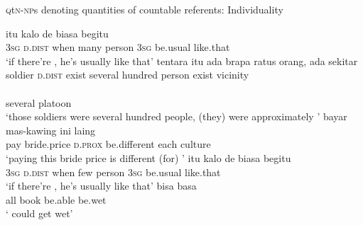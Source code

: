 \begin{styleExampleTitle}
\textsc{q}t\textsc{n-np}s denoting  quantities of countable referents: Individuality
\end{styleExampleTitle}
\ea
\label{Example_8.78}
 {itu} {kalo} {} {} {de} {biasa} {begitu}\\ %
 \textsc{3sg}  \textsc{d.dist}  when  many  person  \textsc{3sg}  be.usual  like.that\\
\glt 
‘if there’re , he’s usually like that’ \textstyleExampleSource{[081025-006-Cv.0272]}
\z
\ea
\label{Example_8.79}
\gll tentara  {itu}  ada  brapa  ratus  orang,  ada  sekitar\\
 soldier  {\textsc{d.dist}}  exist  several  hundred  person  exist  vicinity\\
   {}\\
 {several}  {platoon}\\
\glt 
‘those soldiers were several hundred people, (they) were approximately ’ \textstyleExampleSource{[081029-005-Cv.0131]}
\z
\ea
\label{Example_8.80}
\gll  bayar  mas-kawing  ini  laing    \\
 pay  bride.price  \textsc{d.prox}  be.different  each  culture\\
\glt 
‘paying this bride price is different (for) ’ \textstyleExampleSource{[081006-029-CvEx.0014]}
\z
\ea
\label{Example_8.81}
 {itu} {kalo} {} {} {de} {biasa} {begitu}\\ %
 \textsc{3sg}  \textsc{d.dist}  when  few  person  \textsc{3sg}  be.usual  like.that\\
\glt 
‘if there’re , he’s usually like that’ \textstyleExampleSource{[Elicited BR111021.004]}
\z
\ea
\label{Example_8.82}
 {} {bisa} {basa}\\ %
 all  book  be.able  be.wet\\
\glt 
‘ could get wet’ \textstyleExampleSource{[080917-008-NP.0189]}
\z


